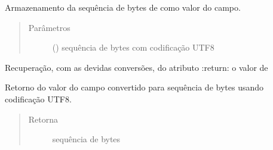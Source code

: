 \documentclass[letterpaper,10pt,brazil]{sphinxmanual}
\begin{document}
\begin{fulllineitems}
\begin{fulllineitems}
\label{\detokenize{estrutarq.campo:estrutarq.campo.campo_cadeia.CampoCadeiaBasico.bytes_para_valor}}
\pysigstartsignatures
{}
\pysigstopsignatures
\sphinxAtStartPar
Armazenamento da sequência de bytes de  como valor
do campo.
\begin{quote}\begin{description}
\item[{Parâmetros}] \leavevmode
\sphinxAtStartPar
{} () \textendash{} sequência de bytes com codificação UTF\sphinxhyphen{}8

\end{description}\end{quote}

\end{fulllineitems}


\begin{fulllineitems}
\label{\detokenize{estrutarq.campo:estrutarq.campo.campo_cadeia.CampoCadeiaBasico.valor}}
\pysigstartsignatures
{}
\pysigstopsignatures
\sphinxAtStartPar
Recuperação, com as devidas conversões, do atributo 
:return: o valor de 

\end{fulllineitems}


\begin{fulllineitems}
\label{\detokenize{estrutarq.campo:estrutarq.campo.campo_cadeia.CampoCadeiaBasico.valor_para_bytes}}
\pysigstartsignatures
{}
\pysigstopsignatures
\sphinxAtStartPar
Retorno do valor do campo convertido para sequência
de bytes usando codificação UTF\sphinxhyphen{}8.
\begin{quote}\begin{description}
\item[{Retorna}] \leavevmode
\sphinxAtStartPar
sequência de bytes


\end{description}
\end{quote}
\end{fulllineitems}
\end{fulllineitems}
\end{document}
